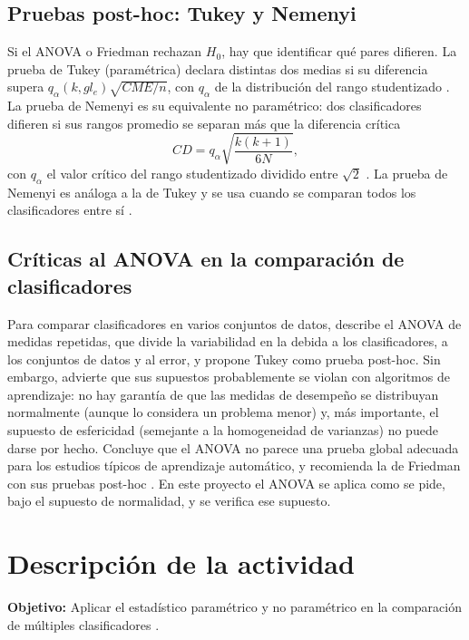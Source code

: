 \documentclass[11pt,letterpaper]{article}
\begin{document}
\subsection{Pruebas post-hoc: Tukey y Nemenyi}

Si el ANOVA o Friedman rechazan $H_0$, hay que identificar qué pares difieren. La prueba de Tukey (paramétrica) declara distintas dos medias si su diferencia supera $q_\alpha(k, gl_e)\sqrt{CME/n}$, con $q_\alpha$ de la distribución del rango studentizado \parencite[sec.~13.6]{walpole2007}. La prueba de Nemenyi es su equivalente no paramétrico: dos clasificadores difieren si sus rangos promedio se separan más que la diferencia crítica
\[
CD = q_\alpha\sqrt{\frac{k(k+1)}{6N}},
\]
con $q_\alpha$ el valor crítico del rango studentizado dividido entre $\sqrt{2}$ \parencite{demsar2006}. La prueba de Nemenyi es análoga a la de Tukey y se usa cuando se comparan todos los clasificadores entre sí \parencite{demsar2006}.

\subsection{Críticas al ANOVA en la comparación de clasificadores}

Para comparar clasificadores en varios conjuntos de datos, \textcite{demsar2006} describe el ANOVA de medidas repetidas, que divide la variabilidad en la debida a los clasificadores, a los conjuntos de datos y al error, y propone Tukey como prueba post-hoc. Sin embargo, advierte que sus supuestos probablemente se violan con algoritmos de aprendizaje: no hay garantía de que las medidas de desempeño se distribuyan normalmente (aunque lo considera un problema menor) y, más importante, el supuesto de esfericidad (semejante a la homogeneidad de varianzas) no puede darse por hecho. Concluye que el ANOVA no parece una prueba global adecuada para los estudios típicos de aprendizaje automático, y recomienda la de Friedman con sus pruebas post-hoc \parencite{demsar2006}. En este proyecto el ANOVA se aplica como se pide, bajo el supuesto de normalidad, y se verifica ese supuesto.

\section{Descripción de la actividad}

\textbf{Objetivo:} Aplicar el estadístico paramétrico y no paramétrico en la comparación de múltiples clasificadores \parencite{tecnm2026_tema32}.
\end{document}
